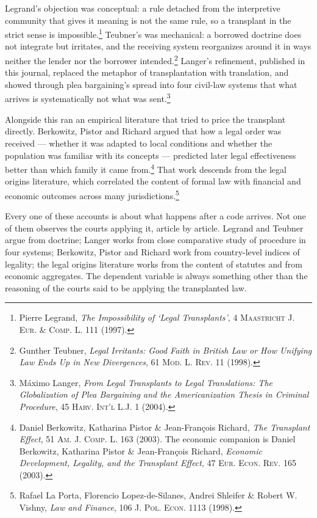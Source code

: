 \documentclass[12pt]{article}
\newcommand{\bjournal}[1]{\textsc{#1}}
\newcommand{\btitle}[1]{\emph{#1}}
\begin{document}
Legrand's objection was conceptual: a rule detached from the interpretive
community that gives it meaning is not the same rule, so a transplant in the
strict sense is impossible.\footnote{Pierre Legrand, \btitle{The Impossibility
of `Legal Transplants'}, 4 \bjournal{Maastricht J. Eur. \& Comp. L.} 111
(1997).} Teubner's was mechanical: a borrowed doctrine does not integrate but
irritates, and the receiving system reorganizes around it in ways neither the
lender nor the borrower intended.\footnote{Gunther Teubner, \btitle{Legal
Irritants: Good Faith in British Law or How Unifying Law Ends Up in New
Divergences}, 61 \bjournal{Mod. L. Rev.} 11 (1998).} Langer's refinement,
published in this journal, replaced the metaphor of transplantation with
translation, and showed through plea bargaining's spread into four civil-law
systems that what arrives is systematically not what was
sent.\footnote{M\'aximo Langer, \btitle{From Legal Transplants to Legal
Translations: The Globalization of Plea Bargaining and the Americanization
Thesis in Criminal Procedure}, 45 \bjournal{Harv. Int'l L.J.} 1 (2004).}

Alongside this ran an empirical literature that tried to price the transplant
directly. Berkowitz, Pistor and Richard argued that how a legal order was
received --- whether it was adapted to local conditions and whether the
population was familiar with its concepts --- predicted later legal
effectiveness better than which family it came from.\footnote{Daniel
Berkowitz, Katharina Pistor \& Jean-Fran\c{c}ois Richard, \btitle{The
Transplant Effect}, 51 \bjournal{Am. J. Comp. L.} 163 (2003). The economic
companion is Daniel Berkowitz, Katharina Pistor \& Jean-Fran\c{c}ois Richard,
\btitle{Economic Development, Legality, and the Transplant Effect}, 47
\bjournal{Eur. Econ. Rev.} 165 (2003).} That work descends from the legal
origins literature, which correlated the content of formal law with financial
and economic outcomes across many jurisdictions.\footnote{Rafael La Porta,
Florencio Lopez-de-Silanes, Andrei Shleifer \& Robert W. Vishny,
\btitle{Law and Finance}, 106 \bjournal{J. Pol. Econ.} 1113 (1998).}

Every one of these accounts is about what happens after a code arrives. Not
one of them observes the courts applying it, article by article. Legrand and
Teubner argue from doctrine; Langer works from close comparative study of
procedure in four systems; Berkowitz, Pistor and Richard work from
country-level indices of legality; the legal origins literature works from the
content of statutes and from economic aggregates. The dependent variable is
always something other than the reasoning of the courts said to be applying
the transplanted law.
\end{document}
